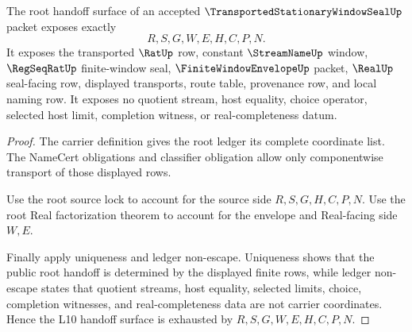 \begin{theorem}
\label{thm:transported-stationary-window-seal-root-ledger-exhaustion}
The root handoff surface of an accepted $\TransportedStationaryWindowSealUp$ packet exposes exactly
$$
R,S,G,W,E,H,C,P,N.
$$
It exposes the transported $\RatUp$ row, constant $\StreamNameUp$ window, $\RegSeqRatUp$ finite-window seal, $\FiniteWindowEnvelopeUp$ packet, $\RealUp$ seal-facing row, displayed transports, route table, provenance row, and local naming row. It exposes no quotient stream, host equality, choice operator, selected host limit, completion witness, or real-completeness datum.
\end{theorem}
\begin{proof}
The carrier definition gives the root ledger its complete coordinate list. The NameCert obligations and classifier obligation allow only componentwise transport of those displayed rows.

Use the root source lock to account for the source side $R,S,G,H,C,P,N$. Use the root Real factorization theorem to account for the envelope and Real-facing side $W,E$.

Finally apply uniqueness and ledger non-escape. Uniqueness shows that the public root handoff is determined by the displayed finite rows, while ledger non-escape states that quotient streams, host equality, selected limits, choice, completion witnesses, and real-completeness data are not carrier coordinates. Hence the L10 handoff surface is exhausted by $R,S,G,W,E,H,C,P,N$.
\end{proof}

